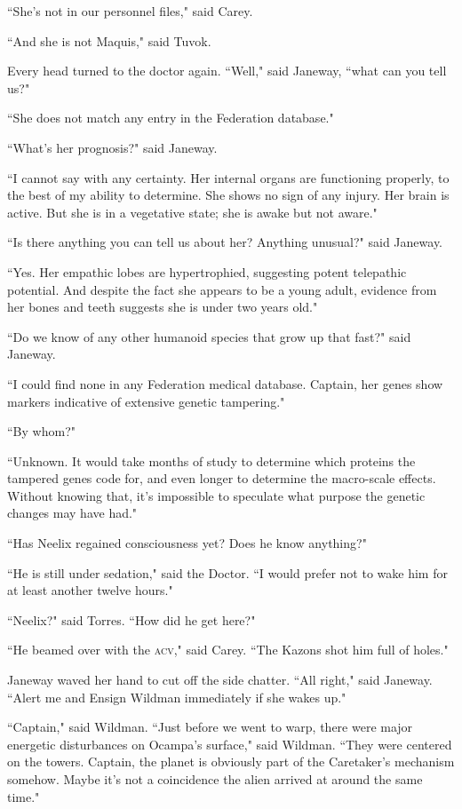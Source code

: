 \documentclass[twoside,letterpaper,12pt]{memoir}
\begin{document}
``She's not in our personnel files," said Carey. 

``And she is not Maquis," said Tuvok. 

Every head turned to the doctor again. ``Well," said Janeway, ``what can you tell us?" 

``She does not match any entry in the Federation database." 

``What's her prognosis?" said Janeway. 

``I cannot say with any certainty. Her internal organs are functioning properly, to the best of my ability to determine. She shows no sign of any injury. Her brain is active. But she is in a vegetative state; she is awake but not aware." 

``Is there anything you can tell us about her? Anything unusual?" said Janeway. 

``Yes. Her empathic lobes are hypertrophied, suggesting potent telepathic potential. And despite the fact she appears to be a young adult, evidence from her bones and teeth suggests she is under two years old." 

``Do we know of any other humanoid species that grow up that fast?" said Janeway. 

``I could find none in any Federation medical database. Captain, her genes show markers indicative of extensive genetic tampering." 

``By whom?" 

``Unknown. It would take months of study to determine which proteins the tampered genes code for, and even longer to determine the macro-scale effects. Without knowing that, it's impossible to speculate what purpose the genetic changes may have had." 

``Has Neelix regained consciousness yet? Does he know anything?" 

``He is still under sedation," said the Doctor. ``I would prefer not to wake him for at least another twelve hours." 

``Neelix?" said Torres. ``How did he get here?" 

``He beamed over with the \textsc{acv}," said Carey. ``The Kazons shot him full of holes." 

Janeway waved her hand to cut off the side chatter. ``All right," said Janeway. ``Alert me and Ensign Wildman immediately if she wakes up." 

``Captain," said Wildman. ``Just before we went to warp, there were major energetic disturbances on Ocampa's surface," said Wildman. ``They were centered on the towers. Captain, the planet is obviously part of the Caretaker's mechanism somehow. Maybe it's not a coincidence the alien arrived at around the same time." 
\end{document}
